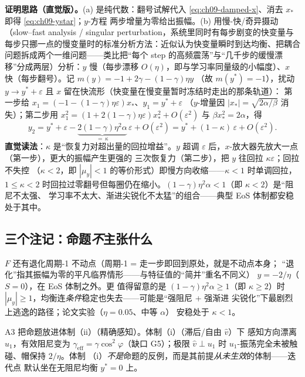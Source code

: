 \textbf{证明思路（直觉版）。}(a) 是纯代数：翻号试解代入
\eqref{eq:ch09-damped-x}、消去 $x_*$ 即得 \eqref{eq:ch09-ystar}；$y$-方程
两步增量为零给出振幅。(b) 用慢-快/奇异摄动（slow--fast analysis / singular perturbation，系统里同时有每步剧变的快变量与每步只挪一点的慢变量时的标准分析方法：近似认为快变量瞬时到达均衡、把耦合问题拆成两个一维问题——类比把“每个 step 的高频震荡”与“几千步的缓慢漂移”分成两层）分析：$y$ 慢（每步漂移
$O(\eta)$，即与学习率同量级的小幅度）、$x$ 快（每步翻号）。记 $m(y)=-1+2\gamma-(1-\gamma)\eta y$
（故 $m(y^*)=-1$），扰动 $y\to y^{*}+\varepsilon$ 且 $x$ 留在快流形（快变量在慢变量暂时冻结时走出的那条轨道）：
第一步给 $x_1=(-1-(1-\gamma)\eta\varepsilon)x_*$、$y_1=y^*+\varepsilon$
（$y$-增量因 $|x_*|=\sqrt{2\alpha/\beta}$ 消失）；第二步用
$x_1^2=(1+2(1-\gamma)\eta\varepsilon)x_*^2+O(\varepsilon^2)$ 与
$\beta x_*^2=2\alpha$，得
\begin{equation}
  y_2 = y^{*}+\varepsilon-\underbrace{2(1-\gamma)\eta^2\alpha}_{=\,\kappa}\,\varepsilon
  +O(\varepsilon^2)
  = y^{*}+(1-\kappa)\,\varepsilon+O(\varepsilon^2).
  \label{eq:ch09-contraction}
\end{equation}
\textbf{直觉读法}：$\kappa$ 是“恢复力对超出量的回拉增益”。$y$ 超调
$\varepsilon$ 后，$x$-放大器先放大一点（第一步），更大的振幅产生更强的
三次恢复力（第二步），把 $y$ 往回拉 $\kappa\varepsilon$；回拉不失控
（$\kappa<2$，即 $|\mu_y|<1$ 的等价形式）即慢方向收缩——$\kappa<1$
时单调回拉，$1\le\kappa<2$ 时回拉过零翻号但每圈仍在缩小。$(1-\gamma)\eta^2\alpha<1$（即 $\kappa<2$）是“阻尼不太强、
学习率不太大、渐进尖锐化不太猛”的组合——典型 EoS 体制都安稳处于其中。

\subsection{三个注记：命题\emph{不}主张什么}\label{sec:ch09-remarks}

\begin{remark}
$F$ 还有退化周期-1 不动点（周期-1 = 走一步即回到原处，就是不动点本身；
``退化''指其振幅为零的平凡临界情形——与特征值的``简并''重名不同义）
$y=-2/\eta$（$S=0$），在 EoS 体制之外。更
值得留意的是 $(1-\gamma)\eta^2\alpha\ge1$（即 $\kappa\ge2$）时
$|\mu_y|\ge1$，均衡连\emph{条件}稳定也失去——可能是“强阻尼 + 强渐进
尖锐化”下最剧烈上逃逸的路径；论文实验（$\eta=0.05$、中等 $\alpha$）
安稳处于 $\kappa<1$。
\end{remark}

\begin{remark}
A3 把命题放进体制（ii）（精确感知）。体制（i）（滞后/自由 $\hat v$）下
感知方向漂离 $u_1$，有效阻尼变为
$\gamma_{\mathrm{eff}}=\gamma\cos^2\varphi$（缺口 G5）；极限
$\hat v\perp u_1$ 时 $u_1$-振荡完全未被触碰、帽保持 $2/\eta$。体制
（i）\emph{不是}命题的反例，而是其前提\emph{从未生效}的体制——迭代点
默认坐在无阻尼均衡 $y^{*}=0$ 上。
\end{remark}

